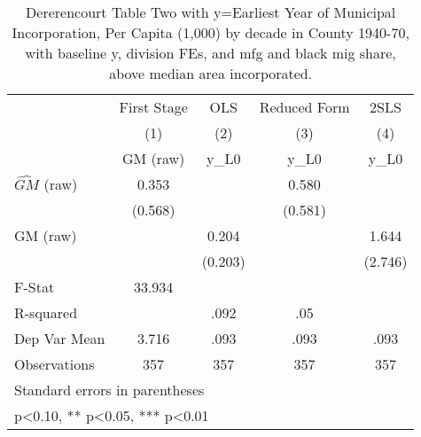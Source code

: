 \begin{table}[htbp]\centering
\def\sym#1{\ifmmode^{#1}\else\(^{#1}\)\fi}
\caption{Dererencourt Table Two with y=Earliest Year of Municipal Incorporation, Per Capita (1,000) by decade in County 1940-70, with baseline y, division FEs, and mfg and black mig share, above median area incorporated.}
\begin{tabular}{l*{4}{c}}
\toprule
                    & First Stage   &         OLS   &Reduced Form   &        2SLS   \\
                    &\multicolumn{1}{c}{(1)}&\multicolumn{1}{c}{(2)}&\multicolumn{1}{c}{(3)}&\multicolumn{1}{c}{(4)}\\
                    &\multicolumn{1}{c}{GM  (raw)}&\multicolumn{1}{c}{y\_L0}&\multicolumn{1}{c}{y\_L0}&\multicolumn{1}{c}{y\_L0}\\
\midrule
$\hat{GM}$ (raw)    &       0.353   &               &       0.580   &               \\
                    &     (0.568)   &               &     (0.581)   &               \\
\addlinespace
GM  (raw)           &               &       0.204   &               &       1.644   \\
                    &               &     (0.203)   &               &     (2.746)   \\
\midrule
F-Stat              &      33.934   &               &               &               \\
R-squared           &               &        .092   &         .05   &               \\
Dep Var Mean        &       3.716   &        .093   &        .093   &        .093   \\
Observations        &         357   &         357   &         357   &         357   \\
\bottomrule
\multicolumn{5}{l}{\footnotesize Standard errors in parentheses}\\
\multicolumn{5}{l}{\footnotesize * p<0.10, ** p<0.05, *** p<0.01}\\
\end{tabular}
\end{table}
